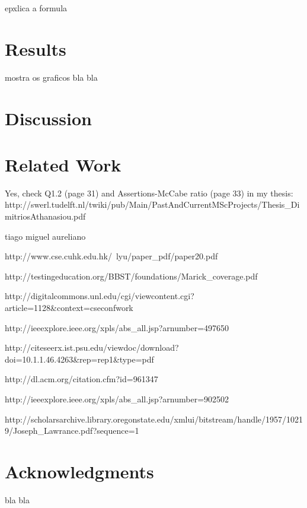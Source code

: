 \documentclass{sig-alternate}
\begin{document}
epxlica a formula

\section{Results}

mostra os graficos bla bla

\section{Discussion}

\section{Related Work}

Yes, check Q1.2 (page 31) and Assertions-McCabe ratio (page 33) in my thesis: http://swerl.tudelft.nl/twiki/pub/Main/PastAndCurrentMScProjects/Thesis_DimitriosAthanasiou.pdf

tiago miguel aureliano

http://www.cse.cuhk.edu.hk/~lyu/paper_pdf/paper20.pdf

http://testingeducation.org/BBST/foundations/Marick_coverage.pdf

http://digitalcommons.unl.edu/cgi/viewcontent.cgi?article=1128&context=cseconfwork

http://ieeexplore.ieee.org/xpls/abs_all.jsp?arnumber=497650

http://citeseerx.ist.psu.edu/viewdoc/download?doi=10.1.1.46.4263&rep=rep1&type=pdf

http://dl.acm.org/citation.cfm?id=961347

http://ieeexplore.ieee.org/xpls/abs_all.jsp?arnumber=902502

http://scholarsarchive.library.oregonstate.edu/xmlui/bitstream/handle/1957/10219/Joseph_Lawrance.pdf?sequence=1


\section{Acknowledgments}

bla bla



\end{document}
